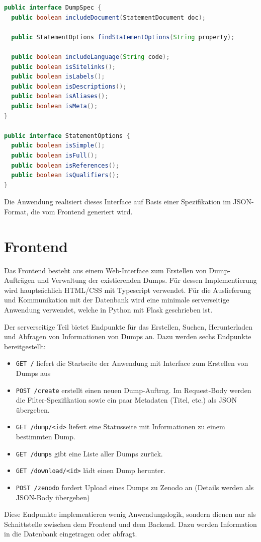 \begin{lstlisting}[language=Java, caption={Interface für die Filterkriterien}, label={lst:interface-dumpspec}]
public interface DumpSpec {
  public boolean includeDocument(StatementDocument doc);

  public StatementOptions findStatementOptions(String property);

  public boolean includeLanguage(String code);
  public boolean isSitelinks();
  public boolean isLabels();
  public boolean isDescriptions();
  public boolean isAliases();
  public boolean isMeta();
}

public interface StatementOptions {
  public boolean isSimple();
  public boolean isFull();
  public boolean isReferences();
  public boolean isQualifiers();
}
\end{lstlisting}

Die Anwendung realisiert dieses Interface auf Basis einer Spezifikation im JSON-Format, die vom Frontend generiert wird. 

\section{Frontend}
Das Frontend besteht aus einem Web-Interface zum Erstellen von Dump-Aufträgen und Verwaltung der existierenden Dumps.
Für dessen Implementierung wird hauptsächlich HTML/CSS mit Typescript verwendet.
Für die Auslieferung und Kommunikation mit der Datenbank wird eine minimale serverseitige Anwendung verwendet, welche in Python mit Flask geschrieben ist.

Der serverseitige Teil bietet Endpunkte für das Erstellen, Suchen, Herunterladen und Abfragen von Informationen von Dumps an.
Dazu werden sechs Endpunkte bereitgestellt:
\begin{itemize}
\item \verb|GET /| liefert die Startseite der Anwendung mit Interface zum Erstellen von Dumps aus
\item \verb|POST /create| erstellt einen neuen Dump-Auftrag. Im Request-Body werden die Filter-Spezifikation sowie ein paar Metadaten (Titel, etc.) als JSON übergeben.
\item \verb|GET /dump/<id>| liefert eine Statusseite mit Informationen zu einem bestimmten Dump.
\item \verb|GET /dumps| gibt eine Liste aller Dumps zurück.
\item \verb|GET /download/<id>| lädt einen Dump herunter.
\item \verb|POST /zenodo| fordert Upload eines Dumps zu Zenodo an (Details werden als JSON-Body übergeben)
\end{itemize}
Diese Endpunkte implementieren wenig Anwendungslogik, sondern dienen nur als Schnittstelle zwischen dem Frontend und dem Backend.
Dazu werden Information in die Datenbank eingetragen oder abfragt.

